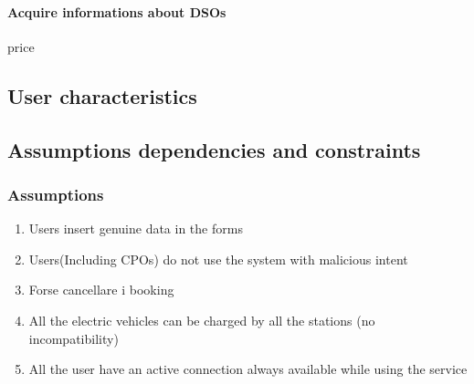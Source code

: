 \paragraph{Acquire informations about \acp{DSO}}
price



\subsection{User characteristics}

\subsection{Assumptions dependencies and constraints}
\subsubsection{Assumptions}
\begin{enumerate}[label=DA\arabic*]
      \item Users insert genuine data in the forms
      \item Users(Including CPOs) do not use the system with malicious intent
      \item Forse cancellare i booking
      \item All the electric vehicles can be charged by all the stations (no incompatibility)
      \item All the user have an active connection always available while using the service
\end{enumerate}
\clearpage